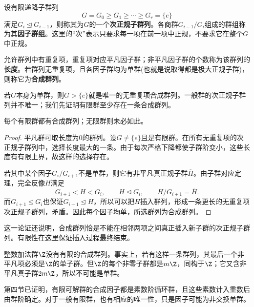 \begin{definition}
设有限递降子群列
\[
G=G_0\geq G_1\geq\cdots\geq G_r=\{e\}
\]
满足$G_i\trianglelefteq G_{i-1}$，则称其为$G$的一个\textbf{次正规子群列}。各商群$G_{i-1}/G_i$组成的群组称为其\textbf{因子群组}。这里的“次”表示只要求每一项在前一项中正规，不要求它在整个$G$中正规。

允许群列中有重复项，重复项对应平凡因子群；非平凡因子群的个数称为该群列的\textbf{长度}。若群列无重复项，且各因子群均为单群(也就是说取得都是极大正规子群)，则称它为\textbf{合成群列}。
\end{definition}

若$G$本身为单群，则$G>\{e\}$就是唯一的无重复项合成群列。一般群的次正规子群列并不唯一；我们先证明有限群至少存在一条合成群列。

\begin{proposition}
每个有限群都有合成群列；无限群则未必如此。
\end{proposition}
\begin{proof}
平凡群可取长度为0的群列。设$G\ne\{e\}$且是有限群。在所有无重复项的次正规子群列中，选择长度最大的一条。由于每次严格下降都使子群阶变小，这些长度有有限上界，故这样的选择存在。

若其中某个因子$G_i/G_{i+1}$不是单群，则它有非平凡真正规子群$\overline H$。由子群对应定理，完全反像$H$满足
\[
G_{i+1}<H<G_i,\qquad H\trianglelefteq G_i,
\qquad H/G_{i+1}=\overline H.
\]
而$G_{i+1}\trianglelefteq G_i$也保证$G_{i+1}\trianglelefteq H$，所以可以把$H$插入群列，形成一条更长的无重复项次正规子群列，矛盾。因此每个因子均单，所选群列为合成群列。
\end{proof}

这一论证还说明，合成群列恰是不能在相邻两项之间真正插入新子群的次正规子群列。有限性在这里保证插入过程最终结束。

\begin{example}
整数加法群$\Z$没有有限的合成群列。事实上，若有这样一条群列，其最后一个非平凡项必须是$\Z$的单子群。但$\Z$的每个非零子群都是$m\Z$，同构于$\Z$；它又含非平凡真子群$2m\Z$，所以不可能是单群。
\end{example}

第四节已证明，有限可解群的合成因子都是素数阶循环群，且这些素数计入重数后由群阶确定。对于一般有限群，也有相应的唯一性，只是因子可能为非交换单群。

